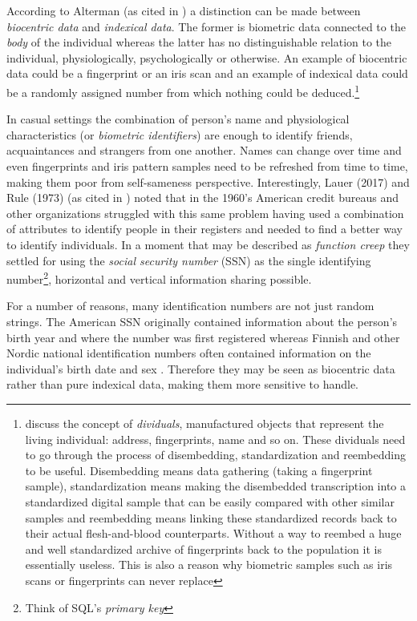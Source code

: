 According to Alterman (as cited in \citet[8]{ajana2013}) a distinction can be made between \emph{biocentric data} and \emph{indexical data}. The former is biometric data connected to the \emph{body} of the individual whereas the latter has no distinguishable relation to the individual, physiologically, psychologically or otherwise. An example of biocentric data could be a fingerprint or an iris scan and an example of indexical data could be a randomly assigned number from which nothing could be deduced.\footnote{\citet{brensinger2021} discuss the concept of \emph{dividuals}, manufactured objects that represent the living individual: address, fingerprints, name and so on. These dividuals need to go through the process of disembedding, standardization and reembedding to be useful. Disembedding means data gathering (taking a fingerprint sample), standardization means making the disembedded transcription into a standardized digital sample that can be easily compared with other similar samples and reembedding means linking these standardized records back to their actual flesh-and-blood counterparts. Without a way to reembed a huge and well standardized archive of fingerprints back to the population it is essentially useless. This is also a reason why biometric samples such as iris scans or fingerprints can never replace}

In casual settings the combination of person's name and physiological characteristics (or \emph{biometric identifiers}) are enough to identify friends, acquaintances and strangers from one another. Names can change over time and even fingerprints and iris pattern samples need to be refreshed from time to time, making them poor from self-sameness perspective. Interestingly, Lauer (2017) and Rule (1973) (as cited in \citet[31--32]{brensinger2021}) noted that in the 1960's American credit bureaus and other organizations struggled with this same problem having used a combination of attributes to identify people in their registers and needed to find a better way to identify individuals. In a moment that may be described as \emph{function creep} they settled for using the \emph{social security number} (SSN) as the single identifying number\footnote{Think of SQL's \emph{primary key}}, horizontal and vertical information sharing possible.

For a number of reasons, many identification numbers are not just random strings. The American SSN originally contained information about the person's birth year and where the number was first registered \citep[32]{brensinger2021} whereas Finnish and other Nordic national identification numbers often contained information on the individual's birth date and sex \citep{watson2010, salste2021}. Therefore they may be seen as biocentric data rather than pure indexical data, making them more sensitive to handle.

